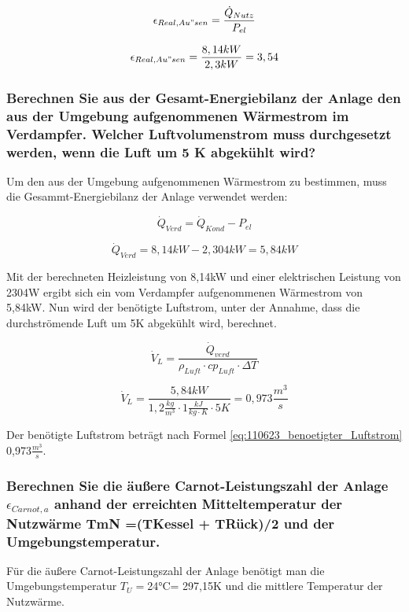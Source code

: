 \begin{equation}
\epsilon_{Real,Au"sen} = \frac{\dot Q_{Nutz}}{P_{el}}
\label{eq:110623_aeußere Leistungszahl_tatsächlich}
\end{equation}

$$ \epsilon_{Real,Au"sen} = \frac{8,14 kW}{2,3 kW} = 3,54$$

\subsubsection{Berechnen Sie aus der Gesamt-Energiebilanz der Anlage den aus der Umgebung aufgenommenen Wärmestrom im Verdampfer.
Welcher Luftvolumenstrom muss durchgesetzt werden, wenn die Luft um 5 K abgekühlt wird?}
Um den aus der Umgebung aufgenommenen Wärmestrom zu bestimmen, muss die Gesammt-Energiebilanz der Anlage verwendet werden:

\begin{equation}
\dot Q_{Verd}=\dot Q_{Kond}-P_{el}
\label{eq:110623_aeußere Leistungszahl}
\end{equation}

$$\dot Q_{Verd}= 8,14 kW-2,304 kW= 5,84kW $$


Mit der berechneten Heizleistung von 8,14kW und einer elektrischen Leistung von 2304W ergibt sich ein vom Verdampfer aufgenommenen Wärmestrom von 5,84kW. Nun wird der benötigte Luftstrom, unter der Annahme, dass die durchströmende Luft um 5K abgekühlt wird, berechnet.

\begin{equation}
\dot V_{L}=\frac{\dot Q_{verd}}{\rho_{Luft} \cdot cp_{Luft} \cdot \Delta T}
\label{eq:110623_benoetigter_Luftstrom}
\end{equation}

$$\dot V_{L}=\frac{5,84 kW}{ 1,2 \frac{kg}{m^3} \cdot 1 \frac{kJ}{kg \cdot K} \cdot 5K}= 0,973 \frac{m^3}{s}$$


Der benötigte Luftstrom beträgt nach Formel \ref{eq:110623_benoetigter_Luftstrom} 0,973$\frac{m^3}{s}$. 
\subsubsection{Berechnen Sie die äußere Carnot-Leistungszahl der Anlage \texorpdfstring{$\epsilon_{Carnot,a}$}{} anhand der erreichten Mitteltemperatur der Nutzwärme TmN =(TKessel + TRück)/2 und der Umgebungstemperatur.}
\label{subsubsec:Carnot}

Für die äußere Carnot-Leistungszahl der Anlage benötigt man die Umgebungstemperatur $T_{U}=$24°C= 297,15K und die mittlere Temperatur der Nutzwärme.


